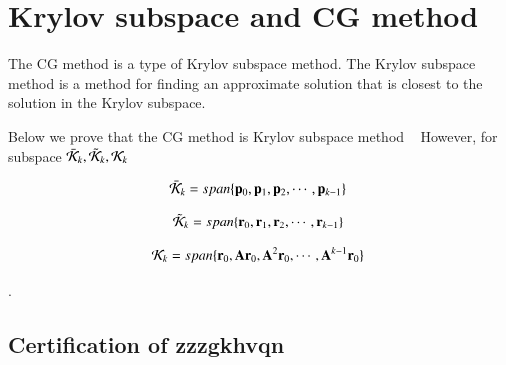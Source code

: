 











\section{Krylov subspace and CG method}

The CG method is a type of Krylov subspace method. The Krylov subspace method is a method for finding an approximate solution that is closest to the solution in the Krylov subspace.


Below we prove that the CG method is Krylov subspace method ~
However, for subspace $\bar{\cal K}_k,\tilde{\cal K}_k,{\cal K}_k$ ~

\begin{equation}
\bar{\cal K}_k=span\{\mathbf{p}_0,\mathbf{p}_1,\mathbf{p}_2,\cdots,\mathbf{p}_{k-1}\}~
\end{equation}


\begin{equation}
\tilde{\cal K}_k=span\{\mathbf{r}_0,\mathbf{r}_1,\mathbf{r}_2,\cdots,\mathbf{r}_{k-1}\}~
\end{equation}


\begin{equation}
{\cal K}_k=span\{\mathbf{r}_0,\mathbf{A}\mathbf{r}_0,\mathbf{A}^2\mathbf{r}_0,\cdots,\mathbf{A}^{k-1}\mathbf{r}_0\}~
\end{equation}

.



\subsection{Certification of zzzgkhvqn}



